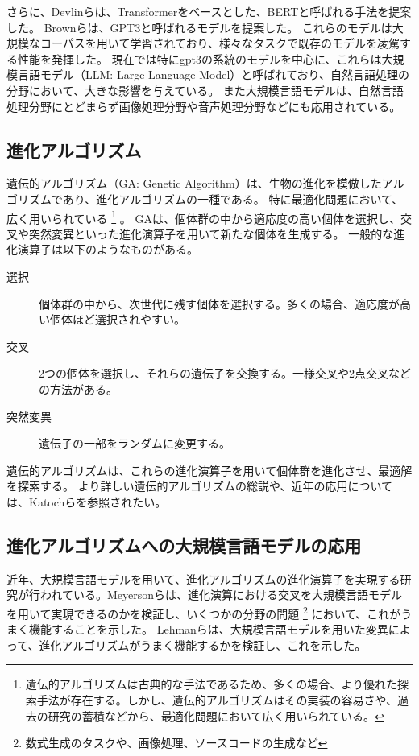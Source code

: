 \documentclass[a4paper,11pt]{jreport}
\begin{document}
さらに、Devlinら\cite{devlin2019bert}は、Transformerをベースとした、BERTと呼ばれる手法を提案した。
Brownら\cite{gpt3}は、GPT3と呼ばれるモデルを提案した。
これらのモデルは大規模なコーパスを用いて学習されており、様々なタスクで既存のモデルを凌駕する性能を発揮した。
現在では特にgpt3の系統のモデルを中心に、これらは大規模言語モデル（LLM: Large Language Model）と呼ばれており、自然言語処理の分野において、大きな影響を与えている。
また大規模言語モデルは、自然言語処理分野にとどまらず画像処理分野や音声処理分野などにも応用されている。

\subsection{進化アルゴリズム}

遺伝的アルゴリズム（GA: Genetic Algorithm）\cite{genetic-algorithm, vose1999simple}は、生物の進化を模倣したアルゴリズムであり、進化アルゴリズムの一種である。
特に最適化問題において、広く用いられている
\footnote{遺伝的アルゴリズムは古典的な手法であるため、多くの場合、より優れた探索手法が存在する。しかし、遺伝的アルゴリズムはその実装の容易さや、過去の研究の蓄積などから、最適化問題において広く用いられている。}
。
GAは、個体群の中から適応度の高い個体を選択し、交叉や突然変異といった進化演算子を用いて新たな個体を生成する。
一般的な進化演算子は以下のようなものがある。
\begin{description}
  \item[選択]
  個体群の中から、次世代に残す個体を選択する。多くの場合、適応度が高い個体ほど選択されやすい。
  \item[交叉] 2つの個体を選択し、それらの遺伝子を交換する。一様交叉や2点交叉などの方法がある。
  \item[突然変異] 遺伝子の一部をランダムに変更する。
\end{description}
遺伝的アルゴリズムは、これらの進化演算子を用いて個体群を進化させ、最適解を探索する。
より詳しい遺伝的アルゴリズムの総説や、近年の応用については、Katochら\cite{katoch2021review}を参照されたい。

\subsection{進化アルゴリズムへの大規模言語モデルの応用}

近年、大規模言語モデルを用いて、進化アルゴリズムの進化演算子を実現する研究が行われている。Meyersonら\cite{meyerson2023language}は、進化演算における交叉を大規模言語モデルを用いて実現できるのかを検証し、いくつかの分野の問題
\footnote{数式生成のタスクや、画像処理、ソースコードの生成など}
において、これがうまく機能することを示した。
Lehmanら\cite{lehman2022evolution}は、大規模言語モデルを用いた変異によって、進化アルゴリズムがうまく機能するかを検証し、これを示した。
\end{document}
